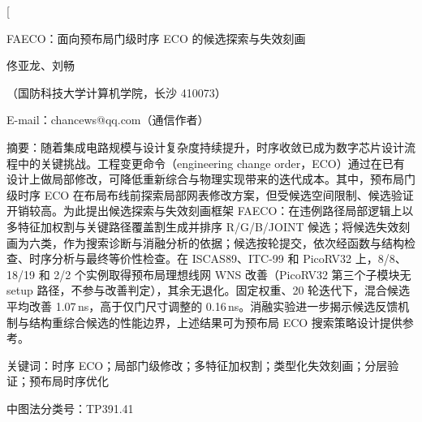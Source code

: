 \documentclass[twocolumn,10pt,fontset=windows]{ctexart}
\let\songti\songfamily\let\heiti\heifamily\let\fangsong\fangfamily
\begin{document}
\pagestyle{plain}

\twocolumn[
\vspace*{-0.25cm}
\begin{center}
{\heiti{} FAECO：面向预布局门级时序 ECO 的候选探索与失效刻画}\par
\vspace{6pt}
{\fangsong{} 佟亚龙、刘畅}\par
\vspace{4pt}
{\songti\fontsize{8}{12}\selectfont（国防科技大学计算机学院，长沙 410073）}\par\vspace{2pt}
{\songti\fontsize{8}{12}\selectfont E-mail：chancews@qq.com（通信作者）}\par
\vspace{6pt}
\end{center}
\begin{flushleft}
  {\heiti\fontsize{8.5}{13}\selectfont 摘\quad 要：}{\songti\fontsize{8.5}{13}\selectfont 随着集成电路规模与设计复杂度持续提升，时序收敛已成为数字芯片设计流程中的关键挑战。工程变更命令（engineering change order，ECO）通过在已有设计上做局部修改，可降低重新综合与物理实现带来的迭代成本。其中，预布局门级时序 ECO 在布局布线前探索局部网表修改方案，但受候选空间限制、候选验证开销较高。为此提出候选探索与失效刻画框架 FAECO：在违例路径局部逻辑上以多特征加权割与关键路径覆盖割生成并排序 R/G/B/JOINT 候选；将候选失效刻画为六类，作为搜索诊断与消融分析的依据；候选按轮提交，依次经函数与结构检查、时序分析与最终等价性检查。在 ISCAS89、ITC-99 和 PicoRV32 上，8/8、18/19 和 2/2 个实例取得预布局理想线网 WNS 改善（PicoRV32 第三个子模块无 setup 路径，不参与改善判定），其余无退化。固定权重、20 轮迭代下，混合候选平均改善 1.07\,ns，高于仅门尺寸调整的 0.16\,ns。消融实验进一步揭示候选反馈机制与结构重综合候选的性能边界，上述结果可为预布局 ECO 搜索策略设计提供参考。}
\par
\vspace{4pt}
{\heiti\fontsize{8.5}{13}\selectfont 关键词：}{\songti\fontsize{8.5}{13}\selectfont 时序 ECO；局部门级修改；多特征加权割；类型化失效刻画；分层验证；预布局时序优化}\par
\vspace{2pt}
{\songti\fontsize{8.5}{13}\selectfont 中图法分类号：TP391.41}\par
\vspace{3pt}
\end{flushleft}
\vspace{2pt}
\end{document}
